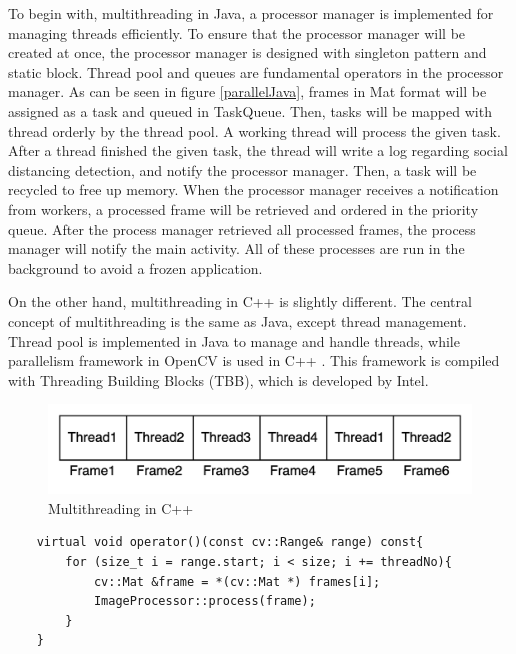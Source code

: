         To begin with, multithreading in Java, a processor manager is implemented for managing threads efficiently.
        To ensure that the processor manager will be created at once,
        the processor manager is designed with singleton pattern and static block.
        Thread pool and queues are fundamental operators in the processor manager.
        As can be seen in figure \ref{parallelJava}, frames in Mat format will be assigned as a task and queued in TaskQueue.
        Then, tasks will be mapped with thread orderly by the thread pool.
        A working thread will process the given task.
        After a thread finished the given task,
        the thread will write a log regarding social distancing detection, and notify the processor manager.
        Then, a task will be recycled to free up memory.
        When the processor manager receives a notification from workers,
        a processed frame will be retrieved and ordered in the priority queue.
        After the process manager retrieved all processed frames,
        the process manager will notify the main activity.
        All of these processes are run in the background to avoid a frozen application.

        On the other hand, multithreading in C++ is slightly different.
        The central concept of multithreading is the same as Java, except thread management.
        Thread pool is implemented in Java to manage and handle threads,
        while parallelism framework in OpenCV is used in C++ \cite{opencv_library}.
        This framework is compiled with Threading Building Blocks (TBB), which is developed by Intel.

        \begin{figure}[!ht]
            \centering
            \includegraphics[width=5in]{images/chapter3/cpp-parallel.png}
            \caption{Multithreading in C++}
            \label{parallelCpp}
        \end{figure}

\begin{lstlisting}
    virtual void operator()(const cv::Range& range) const{
        for (size_t i = range.start; i < size; i += threadNo){
            cv::Mat &frame = *(cv::Mat *) frames[i];
            ImageProcessor::process(frame);
        }
    }
\end{lstlisting}


